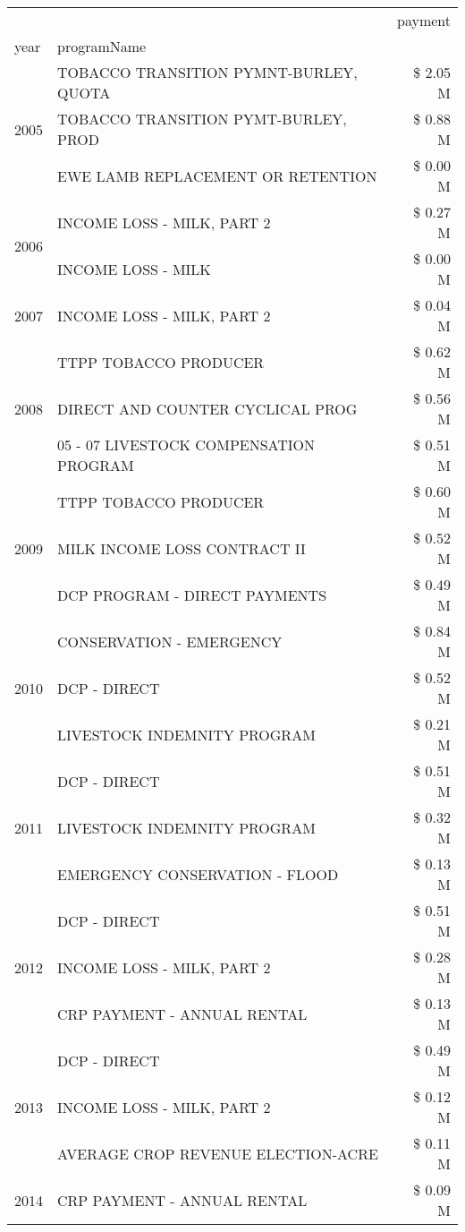 \begin{tabular}{llr}
\toprule
 &  & payment \\
year & programName &  \\
\midrule
\multirow[t]{3}{*}{2005} & TOBACCO TRANSITION PYMNT-BURLEY, QUOTA & \$ 2.05 M \\
 & TOBACCO TRANSITION PYMT-BURLEY, PROD & \$ 0.88 M \\
 & EWE LAMB REPLACEMENT OR RETENTION & \$ 0.00 M \\
\cline{1-3}
\multirow[t]{2}{*}{2006} & INCOME LOSS - MILK, PART 2 & \$ 0.27 M \\
 & INCOME LOSS - MILK & \$ 0.00 M \\
\cline{1-3}
2007 & INCOME LOSS - MILK, PART 2 & \$ 0.04 M \\
\cline{1-3}
\multirow[t]{3}{*}{2008} & TTPP TOBACCO PRODUCER & \$ 0.62 M \\
 & DIRECT AND COUNTER CYCLICAL PROG & \$ 0.56 M \\
 & 05 - 07 LIVESTOCK COMPENSATION PROGRAM & \$ 0.51 M \\
\cline{1-3}
\multirow[t]{3}{*}{2009} & TTPP TOBACCO PRODUCER & \$ 0.60 M \\
 & MILK INCOME LOSS CONTRACT II & \$ 0.52 M \\
 & DCP PROGRAM - DIRECT PAYMENTS & \$ 0.49 M \\
\cline{1-3}
\multirow[t]{3}{*}{2010} & CONSERVATION - EMERGENCY & \$ 0.84 M \\
 & DCP - DIRECT & \$ 0.52 M \\
 & LIVESTOCK INDEMNITY PROGRAM & \$ 0.21 M \\
\cline{1-3}
\multirow[t]{3}{*}{2011} & DCP - DIRECT & \$ 0.51 M \\
 & LIVESTOCK INDEMNITY PROGRAM & \$ 0.32 M \\
 & EMERGENCY CONSERVATION - FLOOD & \$ 0.13 M \\
\cline{1-3}
\multirow[t]{3}{*}{2012} & DCP - DIRECT & \$ 0.51 M \\
 & INCOME LOSS - MILK, PART 2 & \$ 0.28 M \\
 & CRP PAYMENT - ANNUAL RENTAL & \$ 0.13 M \\
\cline{1-3}
\multirow[t]{3}{*}{2013} & DCP - DIRECT & \$ 0.49 M \\
 & INCOME LOSS - MILK, PART 2 & \$ 0.12 M \\
 & AVERAGE CROP REVENUE ELECTION-ACRE & \$ 0.11 M \\
\cline{1-3}
\multirow[t]{3}{*}{2014} & CRP PAYMENT - ANNUAL RENTAL & \$ 0.09 M \\

\end{tabular}
